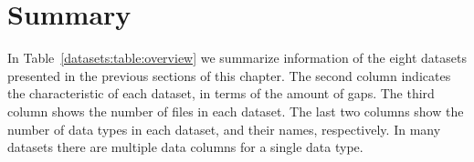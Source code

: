 
\vspace{-10pt}
\section{Summary}
\label{datasets:summary}


In Table~\ref{datasets:table:overview} we summarize information of the eight datasets presented in the previous sections of this chapter. The second column indicates the characteristic of each dataset, in terms of the amount of gaps. The third column shows the number of files in each dataset. The last two columns show the number of data types in each dataset, and their names, respectively. In many datasets there are multiple data columns for a single data type.




